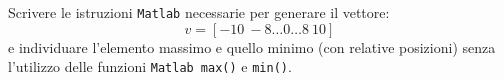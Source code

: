 Scrivere le istruzioni {\tt Matlab} necessarie per generare il vettore:
\[ v = [-10 \ -8 \ldots 0 \ldots 8 \ 10] \]
e individuare l'elemento massimo e quello minimo (con relative posizioni) senza l'utilizzo delle funzioni {\tt Matlab max()} e {\tt min()}. 

